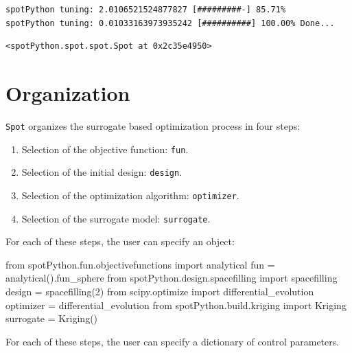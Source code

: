 \documentclass[
  letterpaper,
  DIV=11,
  numbers=noendperiod]{scrreprt}
\newenvironment{Shaded}{\begin{snugshade}}{\end{snugshade}}
\newcommand{\DecValTok}[1]{\textcolor[rgb]{0.68,0.00,0.00}{#1}}
\newcommand{\ImportTok}[1]{\textcolor[rgb]{0.00,0.46,0.62}{#1}}
\newcommand{\NormalTok}[1]{\textcolor[rgb]{0.00,0.23,0.31}{#1}}
\newcommand{\OperatorTok}[1]{\textcolor[rgb]{0.37,0.37,0.37}{#1}}
\providecommand{\tightlist}{%
  \setlength{\itemsep}{0pt}\setlength{\parskip}{0pt}}\usepackage{longtable,booktabs,array}
\begin{document}
\begin{verbatim}
spotPython tuning: 2.0106521524877827 [#########-] 85.71% 
spotPython tuning: 0.01033163973935242 [##########] 100.00% Done...
\end{verbatim}

\begin{verbatim}
<spotPython.spot.spot.Spot at 0x2c35e4950>
\end{verbatim}

\section{Organization}\label{organization}

\texttt{Spot} organizes the surrogate based optimization process in four
steps:

\begin{enumerate}
\def\labelenumi{\arabic{enumi}.}
\tightlist
\item
  Selection of the objective function: \texttt{fun}.
\item
  Selection of the initial design: \texttt{design}.
\item
  Selection of the optimization algorithm: \texttt{optimizer}.
\item
  Selection of the surrogate model: \texttt{surrogate}.
\end{enumerate}

For each of these steps, the user can specify an object:

\begin{Shaded}
\begin{Highlighting}[]
\ImportTok{from}\NormalTok{ spotPython.fun.objectivefunctions }\ImportTok{import}\NormalTok{ analytical}
\NormalTok{fun }\OperatorTok{=}\NormalTok{ analytical().fun\_sphere}
\ImportTok{from}\NormalTok{ spotPython.design.spacefilling }\ImportTok{import}\NormalTok{ spacefilling}
\NormalTok{design }\OperatorTok{=}\NormalTok{ spacefilling(}\DecValTok{2}\NormalTok{)}
\ImportTok{from}\NormalTok{ scipy.optimize }\ImportTok{import}\NormalTok{ differential\_evolution}
\NormalTok{optimizer }\OperatorTok{=}\NormalTok{ differential\_evolution}
\ImportTok{from}\NormalTok{ spotPython.build.kriging }\ImportTok{import}\NormalTok{ Kriging}
\NormalTok{surrogate }\OperatorTok{=}\NormalTok{ Kriging()}
\end{Highlighting}
\end{Shaded}

For each of these steps, the user can specify a dictionary of control
parameters.
\end{document}
